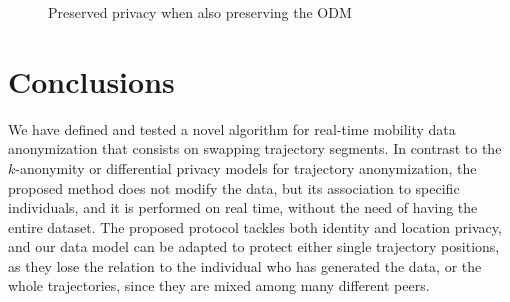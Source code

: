 \documentclass{llncs}
\begin{document}
\begin{figure}
  \hfil
  \caption{Preserved privacy when also preserving the ODM}
  \label{fig:OD}
\end{figure}

\section{Conclusions}

We have defined and tested a novel algorithm for real-time mobility data \linebreak
anonymization that consists on swapping trajectory segments. In contrast to the $k$-anonymity or differential privacy models for trajectory anonymization, the proposed method does not modify the data, but its association to specific individuals, and it is performed on real time, without the need of having the entire dataset.
The proposed protocol tackles both identity and location privacy,
and our data model can be adapted to protect either single trajectory positions, as they lose the relation to the individual who has generated the data, or the whole trajectories, since they are mixed among many different peers.
\end{document}
